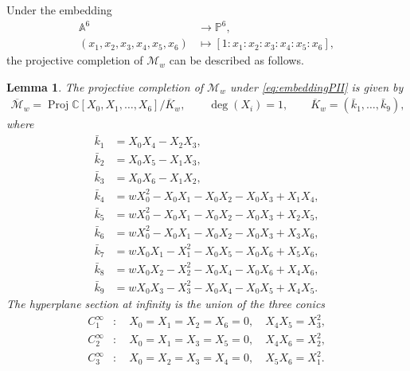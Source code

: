 \documentclass[a4paper,reqno]{amsart}
\numberwithin{equation}{section}
\newcommand{\C}{\mathbb{C}}
\newcommand{\p}{\mathbb{P}}
\newtheorem{lemma}[theorem]{Lemma}
\numberwithin{equation}{section}
\begin{document}
Under the embedding 
\begin{equation} \label{eq:embeddingPII}
    \begin{aligned}
        \mathbb{A}^6 &\rightarrow \p^6,\\
        (x_1,x_2,x_3,x_4,x_5,x_6) &\mapsto [1:x_1:x_2:x_3:x_4:x_5:x_6],
    \end{aligned}
\end{equation}
the projective completion of $\mathcal{M}_w$ can be described as follows.
\begin{lemma} \label{lem:projectivecompletionPII}
The projective completion of $\mathcal{M}_w$ under  \eqref{eq:embeddingPII} is given by
\begin{equation*}
    \begin{gathered}
    \overline{\mathcal{M}}_{w} = \operatorname{Proj} \C[X_0,X_1,\dots,X_6]/\overline{K}_w,      \qquad \operatorname{deg}(X_i)=1, \qquad \overline{K}_w= \left( \bar{k}_1,\dots,\bar{k}_9\right),
    \end{gathered}
\end{equation*} 
where
\begin{equation*}
            \begin{aligned}
            \bar{k}_1 &= X_0 X_4- X_2 X_3,\\
            \bar{k}_2 &= X_0 X_5- X_1 X_3,\\
            \bar{k}_3 &= X_0 X_6- X_1 X_2,\\
            \bar{k}_4 &= w X_0^2-X_0 X_1 -X_0 X_2 - X_0 X_3 +X_1 X_4,\\
            \bar{k}_5 &= w X_0^2-X_0 X_1 -X_0 X_2 - X_0 X_3 +X_2 X_5,\\
            \bar{k}_6 &= w X_0^2-X_0 X_1 -X_0 X_2 - X_0 X_3 +X_3 X_6,\\
            \bar{k}_7 &= w X_0 X_1-X_1^2-X_0 X_5-X_0 X_6+X_5 X_6, \\
            \bar{k}_8 &= w X_0 X_2-X_2^2-X_0 X_4-X_0 X_6+X_4 X_6, \\
            \bar{k}_9 &= w X_0 X_3-X_3^2-X_0 X_4-X_0 X_5+X_4 X_5.
        \end{aligned}
\end{equation*}
The hyperplane section at infinity is the union of the three conics 
  \begin{equation} \label{eq:conicsatinfinityPII}
        \begin{aligned}
            C^{\infty}_1 &: \quad X_0 = X_1=X_2=X_6 = 0 ,\quad X_4 X_5 = X_3^2, \\
            C^{\infty}_2 &: \quad X_0 = X_1=X_3=X_5 = 0 ,\quad X_4 X_6 = X_2^2, \\
            C^{\infty}_3 &: \quad X_0 = X_2=X_3=X_4 = 0 ,\quad X_5 X_6 = X_1^2. 
        \end{aligned}
        \end{equation}
\end{lemma}
\end{document}
